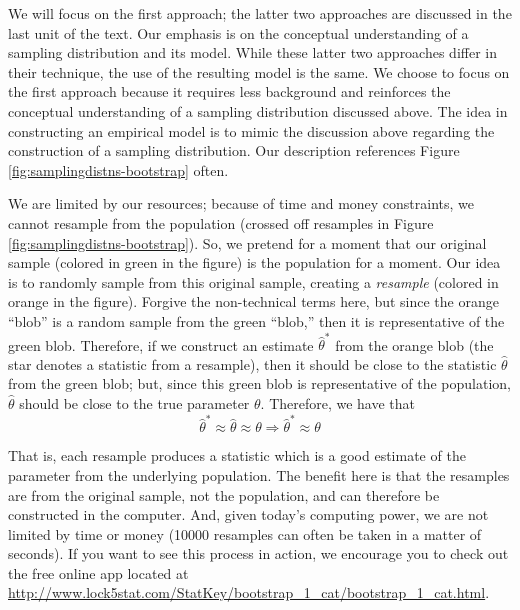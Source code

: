 \documentclass[
]{book}
\theoremstyle{plain}
\theoremstyle{mydefn}
\theoremstyle{myexmpl}
\theoremstyle{remark}
\begin{document}
We will focus on the first approach; the latter two approaches are discussed in the last unit of the text. Our emphasis is on the conceptual understanding of a sampling distribution and its model. While these latter two approaches differ in their technique, the use of the resulting model is the same. We choose to focus on the first approach because it requires less background and reinforces the conceptual understanding of a sampling distribution discussed above. The idea in constructing an empirical model is to mimic the discussion above regarding the construction of a sampling distribution. Our description references Figure \ref{fig:samplingdistns-bootstrap} often.

We are limited by our resources; because of time and money constraints, we cannot resample from the population (crossed off resamples in Figure \ref{fig:samplingdistns-bootstrap}). So, we pretend for a moment that our original sample (colored in green in the figure) is the population for a moment. Our idea is to randomly sample from this original sample, creating a \emph{resample} (colored in orange in the figure). Forgive the non-technical terms here, but since the orange ``blob'' is a random sample from the green ``blob,'' then it is representative of the green blob. Therefore, if we construct an estimate \(\widehat{\theta}^*\) from the orange blob (the star denotes a statistic from a resample), then it should be close to the statistic \(\widehat{\theta}\) from the green blob; but, since this green blob is representative of the population, \(\widehat{\theta}\) should be close to the true parameter \(\theta\). Therefore, we have that
\[
\widehat{\theta}^* \approx \widehat{\theta} \approx \theta \Rightarrow \widehat{\theta}^* \approx \theta
\]

That is, each resample produces a statistic which is a good estimate of the parameter from the underlying population. The benefit here is that the resamples are from the original sample, not the population, and can therefore be constructed in the computer. And, given today's computing power, we are not limited by time or money (10000 resamples can often be taken in a matter of seconds). If you want to see this process in action, we encourage you to check out the free online app located at \url{http://www.lock5stat.com/StatKey/bootstrap_1_cat/bootstrap_1_cat.html}.
\end{document}

